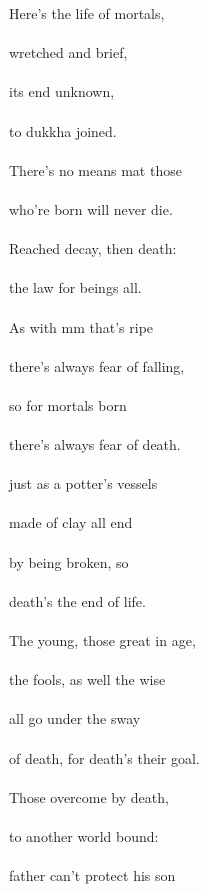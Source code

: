 \begin{MyDescription}[]{}
Here's the life of mortals,\\
\\
wretched and brief,\\
\\
its end unknown,\\
\\
to dukkha joined.\\
\\
There's no means mat those\\
\\
who're born will never die.\\
\\
Reached decay, then death:\\
\\
the law for beings all.\\
\\
As with mm that's ripe\\
\\
there's always fear of falling,\\
\\
so for mortals born\\
\\
there's always fear of death.\\
\\
just as a potter's vessels\\
\\
made of clay all end\\
\\
by being broken, so\\
\\
death's the end of life.\\
\\
The young, those great in age,\\
\\
the fools, as well the wise\\
\\
all go under the sway\\
\\
of death, for death's their goal.\\
\\
Those overcome by death,\\
\\
to another world bound:\\
\\
father can't protect his son\\
\\

\end{MyDescription}
